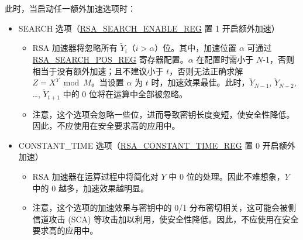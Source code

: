 \documentclass[main\_\_CN.tex]{subfiles}
\begin{document}
此时，当启动任一额外加速选项时：
\begin{itemize}
\item SEARCH 选项（\hyperref[regdesc:RSASEARCHENABLEREG]{RSA\_SEARCH\_ENABLE\_REG} 置 1 开启额外加速）
    \begin{itemize}
        \item RSA 加速器将忽略所有 \begin{math} \widetilde{Y}_{i} \end{math}（\begin{math} i > \alpha \end{math}）位。其中，加速位置 \begin{math} \alpha \end{math} 可通过 \hyperref[regdesc:RSASEARCHPOSREG]{RSA\_SEARCH\_POS\_REG} 寄存器配置。\begin{math} \alpha \end{math} 在配置时需小于 \begin{math}N\end{math}-1，否则相当于没有额外加速；且不建议小于 \begin{math} t \end{math}，否则无法正确求解 \begin{math}Z = X^{Y} \bmod M \end{math}。当设置 \begin{math} \alpha \end{math} 为 \begin{math} t \end{math} 时，加速效果最佳。此时，\begin{math}\widetilde{Y}_{N-1}\end{math}, \begin{math}\widetilde{Y}_{N-2}\end{math}, \dots, \begin{math}\widetilde{Y}_{t+1}\end{math} 中的 0 位将在运算中全部被忽略。
        \item 注意，这个选项会忽略一些位，进而导致密钥长度变短，使安全性降低。因此，不应使用在安全要求高的应用中。
    \end{itemize}
\item CONSTANT\_TIME 选项（\hyperref[regdesc:RSACONSTANTTIMEREG]{RSA\_CONSTANT\_TIME\_REG} 置 0 开启额外加速）
    \begin{itemize}
        \item RSA 加速器在运算过程中将简化对 \begin{math} Y \end{math} 中 0 位的处理。因此不难想象，\begin{math} Y \end{math} 中的 0 越多，加速效果越明显。
        \item 注意，这个选项的加速效果与密钥中的 0/1 分布密切相关，这可能会被侧信道攻击 (SCA) 等攻击加以利用，使安全性降低。因此，不应使用在安全要求高的应用中。
    \end{itemize}
\end{itemize}
\end{document}
